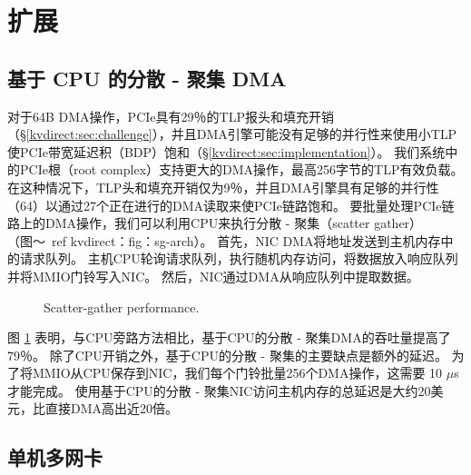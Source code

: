 \section{扩展}
\label{kvdirect:sec:extensions}

\subsection{基于 CPU 的分散 - 聚集 DMA}


对于64B DMA操作，PCIe具有29％的TLP报头和填充开销（\S \ref {kvdirect:sec:challenge}），并且DMA引擎可能没有足够的并行性来使用小TLP使PCIe带宽延迟积（BDP）饱和（\S\ref{kvdirect:sec:implementation}）。
我们系统中的PCIe根（root complex）支持更大的DMA操作，最高256字节的TLP有效负载。 在这种情况下，TLP头和填充开销仅为9％，并且DMA引擎具有足够的并行性（64）以通过27个正在进行的DMA读取来使PCIe链路饱和。
要批量处理PCIe链路上的DMA操作，我们可以利用CPU来执行分散 - 聚集（scatter gather）（图〜\ ref {kvdirect：fig：sg-arch}）。
首先，NIC DMA将地址发送到主机内存中的请求队列。 主机CPU轮询请求队列，执行随机内存访问，将数据放入响应队列并将MMIO门铃写入NIC。 然后，NIC通过DMA从响应队列中提取数据。

\begin{figure}[t]
\centering
{}
\caption{Scatter-gather performance.}
\label{kvdirect:fig:scatter-gather}

\end{figure}

图 \ref {kvdirect:fig:scatter-gather} 表明，与CPU旁路方法相比，基于CPU的分散 - 聚集DMA的吞吐量提高了79％。
除了CPU开销之外，基于CPU的分散 - 聚集的主要缺点是额外的延迟。
为了将MMIO从CPU保存到NIC，我们每个门铃批量256个DMA操作，这需要 10 $\mu$s 才能完成。
使用基于CPU的分散 - 聚集NIC访问主机内存的总延迟是大约20美元，比直接DMA高出近20倍。

\subsection{单机多网卡}
\label{kvdirect:sec:multi-nic}

